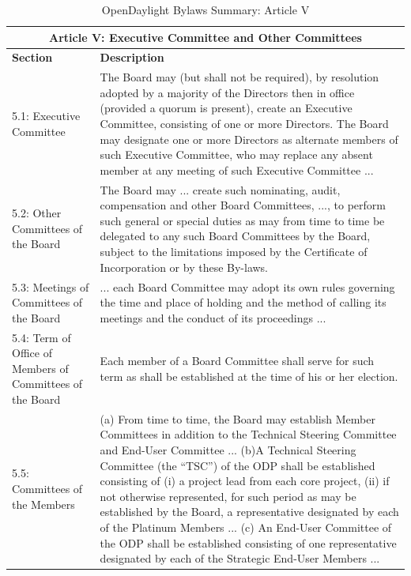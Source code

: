 \documentclass[a4paper, 12pt]{book}
\begin{document}
{\begin{table}[H]
  \begin{center}
    \begin{tabular}{ | p{4cm} | p{11cm} | }
    \toprule
    \multicolumn {2}{|c|}{\textbf{Article V: Executive Committee and Other Committees}} \\
    \hline
    \textbf{Section} & \textbf{Description} \\
    \hline
    5.1: Executive Committee & The Board may (but shall not be required), by resolution adopted by a majority of the Directors then in office (provided a quorum is present), create an Executive Committee, consisting of one or more Directors.  The Board may designate one or more Directors as alternate members of such Executive Committee, who may replace any absent member at any meeting of such Executive Committee ...\\
    \hline
    5.2: Other Committees of the Board & The Board may ... create such nominating, audit, compensation and other Board Committees, ..., to perform such general or special duties as may from time to time be delegated to any such Board Committees by the Board, subject to the limitations imposed by the Certificate of Incorporation or by these By-laws.\\
    \hline
    5.3: Meetings of Committees of the Board & ... each Board Committee may adopt its own rules governing the time and place of holding and the method of calling its meetings and the conduct of its proceedings ...\\
    \hline
    5.4: Term of Office of Members of Committees of the Board & Each member of a Board Committee shall serve for such term as shall be established at the time of his or her election. \\
    \hline
    5.5: Committees of the Members & (a) From time to time, the Board may establish Member Committees in addition to the Technical Steering Committee and End-User Committee ... (b)A Technical Steering Committee (the “TSC”) of the ODP shall be established consisting of (i) a project lead from each core project, (ii) if not otherwise represented, for such period as may be established by the Board, a representative designated by each of the Platinum Members ... (c)  An End-User Committee of the ODP shall be established consisting of one representative designated by each of the Strategic End-User Members ...\\
    \bottomrule
    \end{tabular}
    \caption{OpenDaylight Bylaws Summary: Article V}
    \label{tab:odlbylaws-art05}
  \end{center}
\end{table}

}
\end{document}

